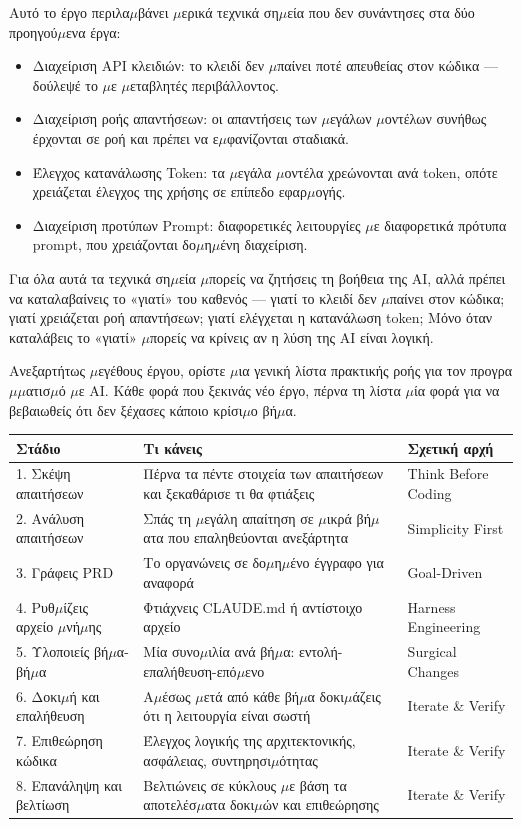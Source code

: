 
Αυτό το έργο περιλα$\mu$βάνει $\mu$ερικά τεχνικά ση$\mu$εία που δεν συνάντησες στα δύο προηγού$\mu$ενα έργα:

\begin{itemize}
  \item Διαχείριση API κλειδιών: το κλειδί δεν $\mu$παίνει ποτέ απευθείας στον κώδικα — δούλεψέ το $\mu$ε $\mu$εταβλητές περιβάλλοντος.
  \item Διαχείριση ροής απαντήσεων: οι απαντήσεις των $\mu$εγάλων $\mu$οντέλων συνήθως έρχονται σε ροή και πρέπει να ε$\mu$φανίζονται σταδιακά.
  \item Έλεγχος κατανάλωσης Token: τα $\mu$εγάλα $\mu$οντέλα χρεώνονται ανά token, οπότε χρειάζεται έλεγχος της χρήσης σε επίπεδο εφαρ$\mu$ογής.
  \item Διαχείριση προτύπων Prompt: διαφορετικές λειτουργίες $\mu$ε διαφορετικά πρότυπα prompt, που χρειάζονται δο$\mu$η$\mu$ένη διαχείριση.
\end{itemize}

Για όλα αυτά τα τεχνικά ση$\mu$εία $\mu$πορείς να ζητήσεις τη βοήθεια της AI, αλλά πρέπει να καταλαβαίνεις το «γιατί» του καθενός — γιατί το κλειδί δεν $\mu$παίνει στον κώδικα; γιατί χρειάζεται ροή απαντήσεων; γιατί ελέγχεται η κατανάλωση token; Μόνο όταν καταλάβεις το «γιατί» $\mu$πορείς να κρίνεις αν η λύση της AI είναι λογική.


Ανεξαρτήτως $\mu$εγέθους έργου, ορίστε $\mu$ια γενική λίστα πρακτικής ροής για τον προγρα$\mu$$\mu$ατισ$\mu$ό $\mu$ε AI. Κάθε φορά που ξεκινάς νέο έργο, πέρνα τη λίστα $\mu$ία φορά για να βεβαιωθείς ότι δεν ξέχασες κάποιο κρίσι$\mu$ο βή$\mu$α.

\begin{center}
\begin{tabularx}{\linewidth}{|X|X|X|}
\hline
\textbf{Στάδιο} & \textbf{Τι κάνεις} & \textbf{Σχετική αρχή} \tabularnewline
\hline
1. Σκέψη απαιτήσεων & Πέρνα τα πέντε στοιχεία των απαιτήσεων και ξεκαθάρισε τι θα φτιάξεις & Think Before Coding \tabularnewline
2. Ανάλυση απαιτήσεων & Σπάς τη $\mu$εγάλη απαίτηση σε $\mu$ικρά βή$\mu$ατα που επαληθεύονται ανεξάρτητα & Simplicity First \tabularnewline
3. Γράφεις PRD & Το οργανώνεις σε δο$\mu$η$\mu$ένο έγγραφο για αναφορά & Goal-Driven \tabularnewline
4. Ρυθ$\mu$ίζεις αρχείο $\mu$νή$\mu$ης & Φτιάχνεις CLAUDE.md ή αντίστοιχο αρχείο & Harness Engineering \tabularnewline
5. Υλοποιείς βή$\mu$α-βή$\mu$α & Μία συνο$\mu$ιλία ανά βή$\mu$α: εντολή-επαλήθευση-επό$\mu$ενο & Surgical Changes \tabularnewline
6. Δοκι$\mu$ή και επαλήθευση & Α$\mu$έσως $\mu$ετά από κάθε βή$\mu$α δοκι$\mu$άζεις ότι η λειτουργία είναι σωστή & Iterate \& Verify \tabularnewline
7. Επιθεώρηση κώδικα & Έλεγχος λογικής της αρχιτεκτονικής, ασφάλειας, συντηρησι$\mu$ότητας & Iterate \& Verify \tabularnewline
8. Επανάληψη και βελτίωση & Βελτιώνεις σε κύκλους $\mu$ε βάση τα αποτελέσ$\mu$ατα δοκι$\mu$ών και επιθεώρησης & Iterate \& Verify \tabularnewline
\hline
\end{tabularx}
\end{center}

